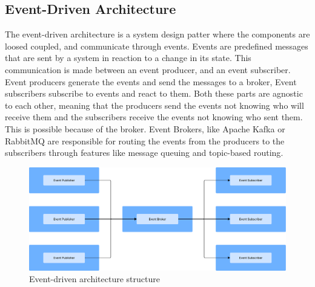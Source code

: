 \subsection{Event-Driven Architecture}
The event-driven architecture is a system design patter where the components
are loosed coupled, and communicate through events. Events are predefined
messages that are sent by a system in reaction to a change in its state.
This communication is made between an event producer, and an event subscriber.
Event producers generate the events and send the messages to a broker, Event
subscribers subscribe to events and react to them. Both these parts are agnostic
to each other, meaning that the producers send the events not knowing who will
receive them and the subscribers receive the events not knowing who sent them.
This is possible because of the broker. Event Brokers, like Apache Kafka or
RabbitMQ are responsible for routing the events from the producers to the
subscribers through features like message queuing and topic-based routing\cite{9226286,manchana2021event,AWSEventDriven}.

\begin{figure}[htbp]
	\centering
	\includegraphics[width=\textwidth, height=0.5\textheight, keepaspectratio]{Chapters/Figures/Architectures/Event-driven.pdf}
	\caption{Event-driven architecture structure}
	\label{fig:architectures:event-driven}
\end{figure}

